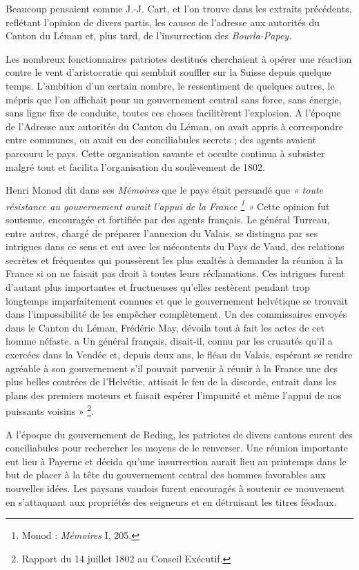 \documentclass[french,twoside]{book} %
\begin{document}
\noindent Beaucoup pensaient comme J.-J. Cart, et l’on trouve dans les extraits précédents, reflétant l’opinion de divers partis, les causes de l’adresse aux autorités du Canton du Léman et, plus tard, de l’insurrection des \emph{Bourla-Papey.}\par
Les nombreux fonctionnaires patriotes destitués cherchaient à opérer une réaction contre le vent d’aristocratie qui semblait souffler sur la Suisse depuis quelque temps. L’ambition d’un certain nombre, le ressentiment de quelques autres, le mépris que l’on affichait pour un gouvernement central sans force, sans énergie, sans ligne fixe de conduite, toutes ces choses facilitèrent l’explosion. A l’époque de l’Adresse aux autorités du Canton du Léman, on avait appris à correspondre entre communes, on avait eu des conciliabules secrets ; des agents avaient parcouru le pays. Cette organisation savante et occulte continua à subsister malgré tout et facilita l’organisation du soulèvement de 1802.\par
Henri Monod dit dans ses \emph{Mémoires} que le pays était persuadé que \emph{« toute résistance au gouvernement aurait l’appui de la France \footnote{Monod : \emph{Mémoires} I, 205.} »} Cette opinion fut soutenue, encouragée et fortifiée par des agents français. Le général Turreau, entre autres, chargé de préparer l’annexion du Valais, se distingua par ses intrigues dans ce sens et eut avec les mécontents du Pays de Vaud, des relations secrètes et fréquentes qui poussèrent les plus exaltés à demander la réunion à la France si on ne faisait pas droit à toutes leurs réclamations. Ces intrigues furent d’autant plus importantes et fructueuses qu’elles restèrent pendant trop longtemps imparfaitement connues et que le gouvernement helvétique se trouvait dans l’impossibilité de les empêcher complètement. Un des commissaires envoyés dans le Canton du Léman, Frédéric May, dévoila tout à fait les actes de cet homme néfaste. a Un général français, disait-il, connu par les cruautés qu’il a exercées dans la Vendée et, depuis deux ans, le fléau du Valais, espérant se rendre agréable à son gouvernement s’il pouvait parvenir à réunir à la France une des plus belles contrées de l’Helvétie, attisait le feu de la discorde, entrait dans les plans des premiers moteurs et faisait espérer l’impunité et même l’appui de nos puissants voisins » \footnote{Rapport du 14 juillet 1802 au Conseil Exécutif.}.\par
A l’époque du gouvernement de Reding, les patriotes de divers cantons eurent des conciliabules pour rechercher les moyens de le renverser. Une réunion importante eut lieu à Payerne et décida qu’une insurrection aurait lieu au printemps dans le but de placer à la tête du gouvernement central des hommes favorables aux nouvelles idées. Les paysans vaudois furent encouragés à soutenir ce mouvement en s’attaquant aux propriétés des seigneurs et en détruisant les titres féodaux.\par
\end{document}
